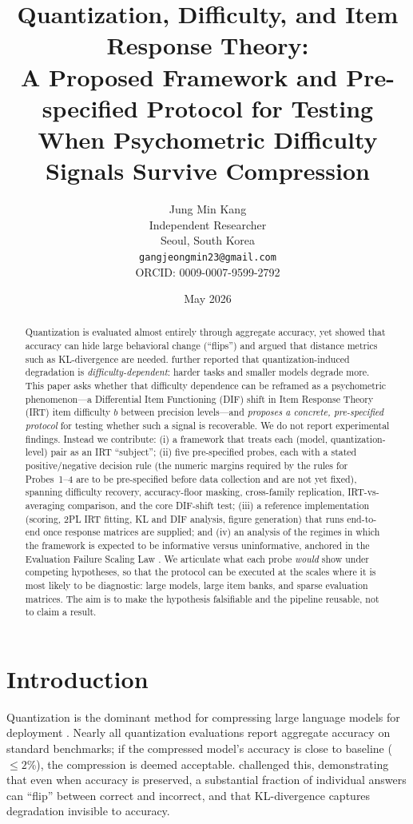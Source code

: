 \documentclass[11pt]{article}
\title{\textbf{Quantization, Difficulty, and Item Response Theory:\\
A Proposed Framework and Pre-specified Protocol for Testing\\
When Psychometric Difficulty Signals Survive Compression}}
\author{Jung Min Kang \\[1.2ex]
Independent Researcher \\[0.4ex]
Seoul, South Korea \\[0.4ex]
\texttt{gangjeongmin23@gmail.com} \\[0.4ex]
ORCID: 0009-0007-9599-2792}
\date{\vspace{1.5\baselineskip}May 2026}
\begin{document}
\maketitle

\begin{abstract}
Quantization is evaluated almost entirely through aggregate accuracy, yet \citet{dutta2024} showed that accuracy can hide large behavioral change (``flips'') and argued that distance metrics such as KL-divergence are needed. \citet{liu2025quant} further reported that quantization-induced degradation is \emph{difficulty-dependent}: harder tasks and smaller models degrade more. This paper asks whether that difficulty dependence can be reframed as a psychometric phenomenon---a Differential Item Functioning (DIF) shift in Item Response Theory (IRT) item difficulty $b$ between precision levels---and \emph{proposes a concrete, pre-specified protocol} for testing whether such a signal is recoverable. We do not report experimental findings. Instead we contribute: (i) a framework that treats each (model, quantization-level) pair as an IRT ``subject''; (ii) five pre-specified probes, each with a stated positive/negative decision rule (the numeric margins required by the rules for Probes~1--4 are to be pre-specified before data collection and are not yet fixed), spanning difficulty recovery, accuracy-floor masking, cross-family replication, IRT-vs-averaging comparison, and the core DIF-shift test; (iii) a reference implementation (scoring, 2PL IRT fitting, KL and DIF analysis, figure generation) that runs end-to-end once response matrices are supplied; and (iv) an analysis of the regimes in which the framework is expected to be informative versus uninformative, anchored in the Evaluation Failure Scaling Law \citep{kang2026efsl}. We articulate what each probe \emph{would} show under competing hypotheses, so that the protocol can be executed at the scales where it is most likely to be diagnostic: large models, large item banks, and sparse evaluation matrices. The aim is to make the hypothesis falsifiable and the pipeline reusable, not to claim a result.
\end{abstract}

\section{Introduction}
Quantization is the dominant method for compressing large language models for deployment \citep{liu2025quant}. Nearly all quantization evaluations report aggregate accuracy on standard benchmarks; if the compressed model's accuracy is close to baseline ($\le 2$\%), the compression is deemed acceptable. \citet{dutta2024} challenged this, demonstrating that even when accuracy is preserved, a substantial fraction of individual answers can ``flip'' between correct and incorrect, and that KL-divergence captures degradation invisible to accuracy.
\end{document}
